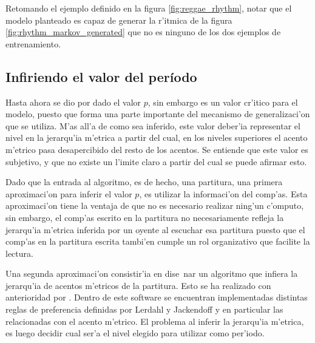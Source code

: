 Retomando el ejemplo definido en la figura \ref{fig:reggae_rhythm}, notar que el modelo planteado es capaz de generar la r'itmica de la figura \ref{fig:rhythm_markov_generated}
que no es ninguno de los dos ejemplos de entrenamiento.

\begin{imagen}
\end{imagen}


\subsection{Infiriendo el valor del per\'iodo}
Hasta ahora se dio por dado el valor $p$, sin embargo es un valor cr'itico para el modelo, puesto que forma una parte importante del mecanismo de generalizaci'on que se 
utiliza. M'as all'a de como sea inferido, este valor deber'ia representar el nivel en la jerarqu'ia m'etrica a partir del cual, en los niveles superiores el acento m'etrico 
pasa desapercibido del resto de los acentos. Se entiende que este valor es subjetivo, y que no existe un l'imite claro a partir del cual se puede afirmar esto.

Dado que la entrada al algoritmo, es de hecho, una partitura, una primera aproximaci'on para inferir el valor $p$, es utilizar la informaci'on del comp'as. 
Esta aproximaci'on tiene la ventaja de que no es necesario realizar ning'un c'omputo, sin embargo, el comp'as escrito en la partitura no necesariamente refleja la jerarqu'ia
m'etrica inferida por un oyente al escuchar esa partitura puesto que el comp'as en la partitura escrita tambi'en cumple un rol organizativo que facilite la lectura. 

Una segunda aproximaci'on consistir'ia en dise~nar un algoritmo que infiera la jerarqu'ia de acentos m'etricos de la partitura. Esto se ha realizado con anterioridad por
\cite{Temperley2001}. Dentro de este software se encuentran implementadas distintas reglas de preferencia definidas por Lerdahl y Jackendoff y 
en particular las relacionadas con el acento m'etrico. El problema al inferir la jerarqu'ia m'etrica, es luego decidir cual ser'a el nivel elegido para utilizar como per'iodo.


